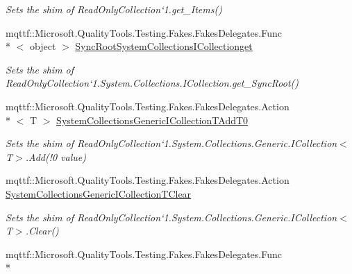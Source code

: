 \begin{DoxyCompactItemize}
\begin{DoxyCompactList}\small\item\em Sets the shim of Read\-Only\-Collection`1.get\-\_\-\-Items()\end{DoxyCompactList}\item 
mqttf\-::\-Microsoft.\-Quality\-Tools.\-Testing.\-Fakes.\-Fakes\-Delegates.\-Func\\*
$<$ object $>$ \hyperlink{class_system_1_1_collections_1_1_object_model_1_1_fakes_1_1_shim_read_only_collection_3_01_t_01_4_a5c965b758455c477ccceeb57b07b1370}{Sync\-Root\-System\-Collections\-I\-Collectionget}
\begin{DoxyCompactList}\small\item\em Sets the shim of Read\-Only\-Collection`1.System.\-Collections.\-I\-Collection.\-get\-\_\-\-Sync\-Root()\end{DoxyCompactList}\item 
mqttf\-::\-Microsoft.\-Quality\-Tools.\-Testing.\-Fakes.\-Fakes\-Delegates.\-Action\\*
$<$ T $>$ \hyperlink{class_system_1_1_collections_1_1_object_model_1_1_fakes_1_1_shim_read_only_collection_3_01_t_01_4_a46fe94d531aba8843f1f7458e29fdeeb}{System\-Collections\-Generic\-I\-Collection\-T\-Add\-T0}
\begin{DoxyCompactList}\small\item\em Sets the shim of Read\-Only\-Collection`1.System.\-Collections.\-Generic.\-I\-Collection$<$T$>$.Add(!0 value)\end{DoxyCompactList}\item 
mqttf\-::\-Microsoft.\-Quality\-Tools.\-Testing.\-Fakes.\-Fakes\-Delegates.\-Action \hyperlink{class_system_1_1_collections_1_1_object_model_1_1_fakes_1_1_shim_read_only_collection_3_01_t_01_4_a83591a065faef12bd58f51aae1bde2a5}{System\-Collections\-Generic\-I\-Collection\-T\-Clear}
\begin{DoxyCompactList}\small\item\em Sets the shim of Read\-Only\-Collection`1.System.\-Collections.\-Generic.\-I\-Collection$<$T$>$.Clear()\end{DoxyCompactList}\item 
mqttf\-::\-Microsoft.\-Quality\-Tools.\-Testing.\-Fakes.\-Fakes\-Delegates.\-Func\\*

\end{DoxyCompactItemize}

